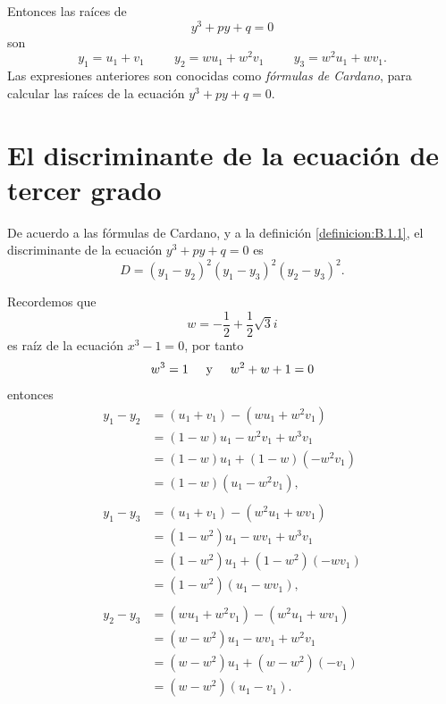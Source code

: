 Entonces las raíces de
$$y^3+py+q=0$$
son
\begin{equation}
    y_1=u_1+v_1 \hspace{1cm} y_2=wu_1+w^2v_1 \hspace{1cm} y_3=w^2u_1+wv_1. \label{APPCOSIPA3}
\end{equation}
Las expresiones anteriores son conocidas como \textit{fórmulas de Cardano}, para calcular las raíces de la ecuación $y^3+py+q=0$.

\newpage
\section{El discriminante de la ecuación de tercer grado}

De acuerdo a las fórmulas de Cardano, y a la definición \ref{definicion:B.1.1}, el discriminante de la ecuación $y^3+py+q=0$ es
$$D=(y_1-y_2)^2(y_1-y_3)^2(y_2-y_3)^2.$$

Recordemos que
$$w=-\frac{1}{2}+\frac{1}{2}\sqrt{3}i$$
es raíz de la ecuación $x^3-1=0$, por tanto
$$w^3=1 \hspace{0.5cm} \text{y} \hspace{0.5cm} w^2+w+1=0$$
entonces
\begin{align*}
    y_1-y_2 &=(u_1+v_1)-\left(wu_1+w^2v_1\right) \\
    &=(1-w)u_1-w^2v_1+w^3v_1 \\
    &=(1-w)u_1+(1-w)\left(-w^2v_1\right) \\
    &=(1-w)\left(u_1-w^2v_1\right), \\
    & \\
    y_1-y_3 &=(u_1+v_1)-\left( w^2u_1+wv_1 \right) \\
    &=\left( 1-w^2 \right) u_1-wv_1+w^3v_1 \\
    &=\left( 1-w^2 \right) u_1+\left( 1-w^2 \right) (-wv_1) \\
    &=\left( 1-w^2 \right) (u_1-wv_1), \\
    & \\
    y_2-y_3 &=\left( wu_1+w^2v_1 \right) - \left( w^2u_1+wv_1 \right) \\
    &=\left( w-w^2 \right) u_1-wv_1+w^2v_1 \\
    &=\left( w-w^2 \right) u_1+\left( w-w^2 \right) (-v_1) \\
    &=\left( w-w^2 \right) (u_1-v_1).
\end{align*}

